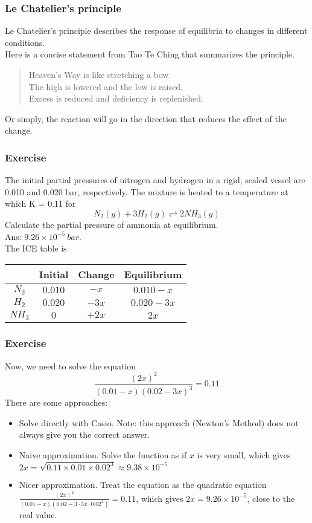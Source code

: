 \documentclass[aspectratio=169]{beamer}
\def\blankline{\\[12pt]}
\begin{document}
\begin{frame}
  \frametitle{Le Chatelier's principle}
  Le Chatelier's principle describes the response of equilibria to changes in 
  different conditions.
  \blankline
  Here is a concise statement from Tao Te Ching that summarizes the principle.
  \begin{quote}
    Heaven's Way is like stretching a bow.\\
    The high is lowered and the low is raised. \\
    Excess is reduced and deficiency is replenished.
  \end{quote}
  Or simply, the reaction will go in the direction that reduces the effect of the change.
\end{frame}
\begin{frame}
  \frametitle{Exercise}
  The initial partial pressures of nitrogen and hydrogen in a rigid, sealed vessel are 0.010 and 0.020 bar, 
  respectively. The mixture is heated to a temperature at which K = 0.11 for
  \begin{equation*}
    N_2(g) + 3H_2(g) \rightleftharpoons 2NH_3(g)
  \end{equation*}
  Calculate the partial pressure of ammonia at equilibrium.
  \pause
  \blankline
  Ans: $9.26\times 10^{-5}\ bar$. \\
  The ICE table is
  \begin{table}[h]
    \centering
    \begin{tabular}{|c|c|c|c|}
      \hline
      & Initial & Change & Equilibrium \\
      \hline
      $N_2$ & $0.010$ & $-x$ & $0.010-x$ \\
      \hline
      $H_2$ & $0.020$ & $-3x$ & $0.020-3x$ \\
      \hline
      $NH_3$ & $0$ & $+2x$ & $2x$ \\
      \hline
    \end{tabular}
  \end{table}
\end{frame}
\begin{frame}
  \frametitle{Exercise}
  Now, we need to solve the equation
  \begin{equation*}
    \frac{\left(2x\right)^2}{\left(0.01-x\right)\left(0.02-3x\right)^3} = 0.11
  \end{equation*}
  There are some approaches:
  \begin{itemize}
    \item Solve directly with Casio. Note: this approach (Newton's Method) does not always give you the correct answer.
    \item Naive approximation. Solve the function as if $x$ is very small, which gives $2x = \sqrt{0.11\times 0.01\times 0.02^3}\approx 9.38\times 10^{-5}$
    \item Nicer approximation. Treat the equation as the quadratic equation $\frac{(2x)^2}{(0.01 - x)(0.02 - 3\cdot 3x \cdot 0.02^2)} = 0.11$, which gives $2x = 9.26\times 10^{-5}$, 
    close to the real value.
  \end{itemize}
\end{frame}
\end{document}
